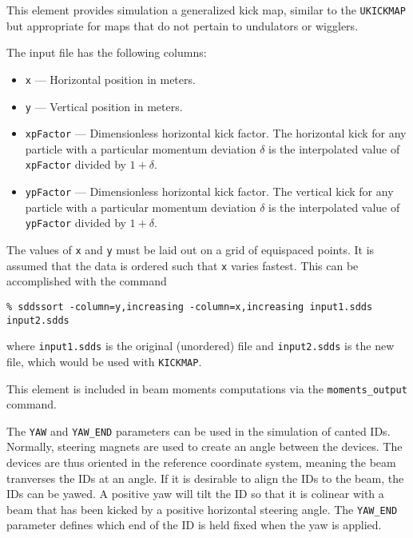 This element provides simulation a generalized kick map, similar to 
the \verb|UKICKMAP| but appropriate for maps that do not pertain to undulators or
wigglers.

The input file has the following columns:
\begin{itemize}
\item \verb|x| --- Horizontal position in meters.
\item \verb|y| --- Vertical position in meters.
\item \verb|xpFactor| --- Dimensionless horizontal kick factor.  The horizontal kick for any particle with
  a particular momentum deviation $\delta$ is the interpolated value of \verb|xpFactor| divided by $1+\delta$.
\item \verb|ypFactor| --- Dimensionless horizontal kick factor. The vertical kick for any particle with
  a particular momentum deviation $\delta$ is the interpolated value of \verb|ypFactor| divided by $1+\delta$.
\end{itemize}
The values of \verb|x| and \verb|y| must be laid out on a grid of equispaced points.
It is assumed that the data is ordered such that \verb|x| varies fastest.  This can be
accomplished with the command
\begin{verbatim}
% sddssort -column=y,increasing -column=x,increasing input1.sdds input2.sdds
\end{verbatim}
where \verb|input1.sdds| is the original (unordered) file and \verb|input2.sdds| is the
new file, which would be used with \verb|KICKMAP|.

This element is included in beam moments computations via the \verb|moments_output| command.

The \verb|YAW| and \verb|YAW_END| parameters can be used in the simulation of canted IDs.
Normally, steering magnets are used to create an angle between the devices.
The devices are thus oriented in the reference coordinate system, meaning the beam tranverses
the IDs at an angle.
If it is desirable to align the IDs to the beam, the IDs can be yawed. A positive yaw will
tilt the ID so that it is colinear with a beam that has been kicked by a positive horizontal
steering angle.
The \verb|YAW_END| parameter defines which end of the ID is held fixed when the yaw is applied.

